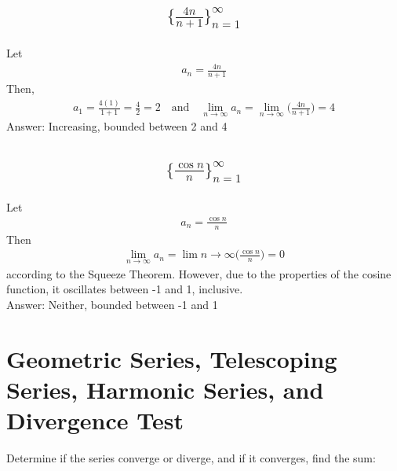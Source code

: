 \documentclass{article}
\begin{document}
\subsection{
	\begin{align*}
		\biggl\{ \frac{4n}{n + 1} \biggl\}_{n=1}^\infty
	\end{align*}
}
Let
\begin{align*}
	a_n = \frac{4n}{n + 1}
\end{align*}
Then,
\begin{align*}
	a_1 = \frac{4(1)}{1 + 1} = \frac{4}{2} = 2 \quad \text{and} \quad \lim_{n \to \infty} a_n = \lim_{n \to \infty} \bigg( \frac{4n}{n + 1} \bigg) = 4
\end{align*}
Answer: Increasing, bounded between 2 and 4

\subsection{
	\begin{align*}
		\biggl\{ \frac{\cos{n}}{n} \biggl\}_{n=1}^\infty
	\end{align*}
}
Let
\begin{align*}
	a_n = \frac{\cos{n}}{n}
\end{align*}
Then
\begin{align*}
	\lim_{n \to \infty} a_n = \lim{n \to \infty} \bigg( \frac{\cos{n}}{n} \bigg) = 0
\end{align*}
according to the Squeeze Theorem. However, due to the properties of the cosine function, it oscillates between -1 and 1, inclusive. \\[10pt]
Answer: Neither, bounded between -1 and 1

\section{Geometric Series, Telescoping Series, Harmonic Series, and Divergence Test}

Determine if the series converge or diverge, and if it converges, find the sum:
\end{document}
